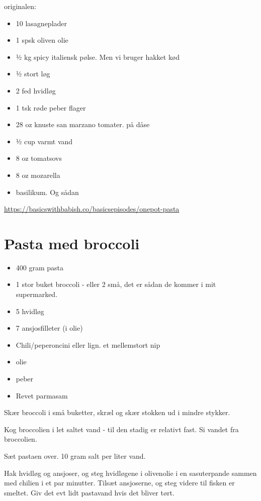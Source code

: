 \documentclass[
]{book}
\providecommand{\tightlist}{%
  \setlength{\itemsep}{0pt}\setlength{\parskip}{0pt}}
\begin{document}
originalen:

\begin{itemize}
\tightlist
\item
  10 lasagneplader
\item
  1 spsk oliven olie
\item
  ½ kg spicy italiensk pølse. Men vi bruger hakket kød
\item
  ½ stort løg
\item
  2 fed hvidløg
\item
  1 tsk røde peber flager
\item
  28 oz knuste san marzano tomater. på dåse
\item
  ½ cup varmt vand
\item
  8 oz tomatsovs
\item
  8 oz mozarella
\item
  basilikum. Og sådan
\end{itemize}

\url{https://basicswithbabish.co/basicsepisodes/onepot-pasta}

\hypertarget{pasta-med-broccoli}{%
\section{Pasta med broccoli}\label{pasta-med-broccoli}}

\begin{itemize}
\tightlist
\item
  400 gram pasta
\item
  1 stor buket broccoli - eller 2 små, det er sådan de kommer i mit supermarked.
\item
  5 hvidløg
\item
  7 ansjosfilleter (i olie)
\item
  Chili/peperoncini eller lign. et mellemstort nip
\item
  olie
\item
  peber
\item
  Revet parmasam
\end{itemize}

Skær broccoli i små buketter, skræl og skær stokken ud i mindre stykker.

Kog broccolien i let saltet vand - til den stadig er relativt fast. Si vandet fra broccolien.

Sæt pastaen over. 10 gram salt per liter vand.

Hak hvidløg og ansjoser, og steg hvidløgene i olivenolie i en sasuterpande sammen med chilien i et par minutter. Tilsæt ansjoserne, og steg videre til fisken er smeltet. Giv det evt lidt pastavand hvis det bliver tørt.
\end{document}
